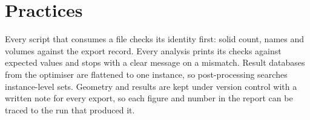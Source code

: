 \section{Practices}\label{sec:wf-practices}

Every script that consumes a file checks its identity first: solid count, names and volumes against the export record. Every analysis prints its checks against expected values and stops with a clear message on a mismatch. Result databases from the optimiser are flattened to one instance, so post-processing searches instance-level sets. Geometry and results are kept under version control with a written note for every export, so each figure and number in the report can be traced to the run that produced it.
